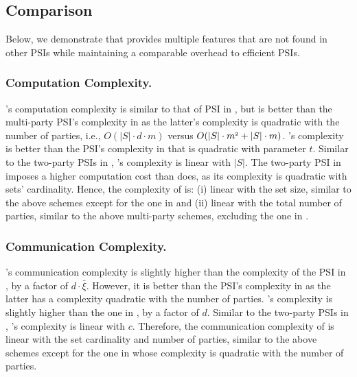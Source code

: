 \subsection{Comparison}
\vspace{-1mm}


Below, we demonstrate that \epsi provides multiple features that are not found in other PSIs while maintaining a comparable  overhead to efficient PSIs.

\vspace{-4.4mm}
\subsubsection{Computation Complexity.} \epsi's computation complexity is similar to that of PSI in \cite{AbadiDMT22}, but is better than the multi-party PSI's complexity in \cite{DBLP:conf/ccs/KolesnikovMPRT17} as  the latter's complexity is quadratic with the number of parties, i.e., $O(|S|\cdot d\cdot m)$ versus $O(|S|\cdot m^{\scriptscriptstyle 2}+|S|\cdot m )$. \epsi's complexity  is better than the PSI's complexity in   \cite{NevoTY21}  that is quadratic with parameter $t$. Similar to the two-party PSIs in \cite{DebnathD16,RaghuramanR22}, \epsi's complexity is linear with $|S|$.  The two-party PSI in \cite{DBLP:conf/dbsec/DongCCR13} imposes a higher computation cost than \epsi does, as its complexity is quadratic with sets' cardinality. Hence, the complexity of \epsi is: (i) linear with the set size, similar to the above schemes except for the one in \cite{DBLP:conf/dbsec/DongCCR13} and (ii) linear with the total number of parties, similar to  the above multi-party schemes, excluding the one in \cite{DBLP:conf/ccs/KolesnikovMPRT17}. 
%

\vspace{-5mm}
\subsubsection{Communication Complexity.}  \epsi's communication complexity is slightly higher than the complexity of the PSI in \cite{AbadiDMT22}, by a factor of $d\cdot \bar\xi$. However, it is better than the  PSI's complexity in \cite{DBLP:conf/ccs/KolesnikovMPRT17} as the latter has a complexity quadratic with the number of parties. \epsi's complexity is slightly higher than the one in \cite{NevoTY21}, by a factor of $d$. Similar to the two-party PSIs in  \cite{DebnathD16,RaghuramanR22,DBLP:conf/dbsec/DongCCR13}, \epsi's complexity is linear with $c$. 
%
Therefore, the communication complexity of \epsi is linear with the set cardinality and number of parties, similar to the above schemes except for the one in \cite{DBLP:conf/ccs/KolesnikovMPRT17} whose complexity is quadratic with the number of parties. 

